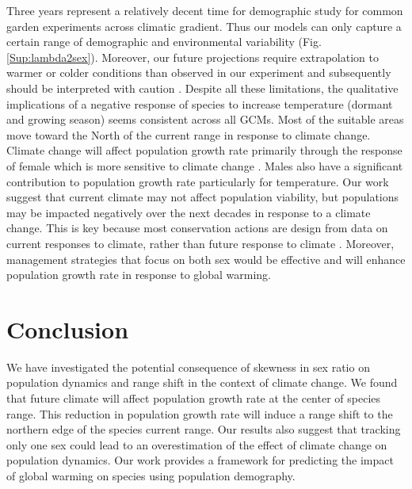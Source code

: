 \documentclass[12pt]{article}
\begin{document}
Three years represent a relatively decent time for demographic study for common garden experiments across climatic gradient.
Thus our models can only capture a certain range of demographic and environmental variability (Fig. \ref{Sup:lambda2sex}).
Moreover, our future projections require extrapolation to warmer or colder conditions than observed in our experiment and subsequently should be interpreted with caution \citep{chen2024influence}. 
Despite all these limitations, the qualitative implications of a negative response of species to increase temperature (dormant and growing season) seems consistent across all GCMs.  
Most of the suitable areas move toward the North of the current range in response to climate change.
Climate change will affect population growth rate primarily through the response of female which is more sensitive to climate change \citep{miller2022two}.
Males also have a significant contribution to population growth rate particularly for temperature. 
Our work suggest that current climate may not affect population viability, but populations may be impacted negatively over the next decades in response to a climate change. 
This is key because most conservation actions are design from  data on current responses to climate, rather than future response to climate \citep{sletvold2013climate}. 
Moreover, management strategies that focus on both sex would be effective and will enhance population growth rate in response to global warming. 

\section*{Conclusion}
We have investigated the potential consequence of skewness in sex ratio on population dynamics and range shift in the context of climate change. 
We found that future climate will affect population growth rate at the center of species range.
This reduction in population growth rate will induce a range shift to the northern edge of the species current range. 
Our results also suggest that tracking only one sex could lead to an overestimation of the effect of climate change on population dynamics. 
Our work  provides a framework for predicting the impact of global warming on species using population demography. 
\end{document}
